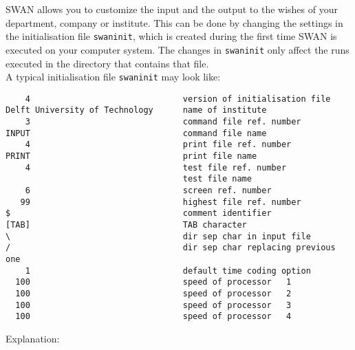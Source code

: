 \documentclass[12pt]{book}
\begin{document}
SWAN allows you to customize the input and the output to the wishes of your
department, company or institute. This can be done by changing the settings
in the initialisation file {\tt swaninit}, which is created during the first time
SWAN is executed on your computer system. The changes in {\tt swaninit} only affect
the runs executed in the directory that contains that file.
\\[2ex]
\noindent
A typical initialisation file {\tt swaninit} may look like:
\begin{verbatim}
    4                               version of initialisation file
Delft University of Technology      name of institute
    3                               command file ref. number
INPUT                               command file name
    4                               print file ref. number
PRINT                               print file name
    4                               test file ref. number
                                    test file name
    6                               screen ref. number
   99                               highest file ref. number
$                                   comment identifier
[TAB]                               TAB character
\                                   dir sep char in input file
/                                   dir sep char replacing previous one
    1                               default time coding option
  100                               speed of processor   1
  100                               speed of processor   2
  100                               speed of processor   3
  100                               speed of processor   4
\end{verbatim}
\newpage
\noindent
Explanation:
\end{document}
